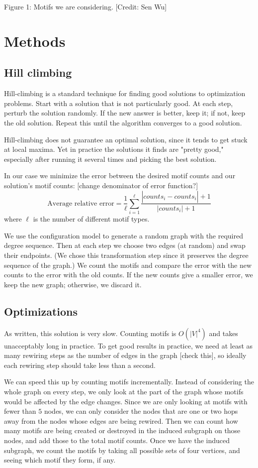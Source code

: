 \documentclass[12pt]{article}
\begin{document}
Figure 1: Motifs we are considering.  [Credit: Sen Wu]

\section{Methods}
\subsection{Hill climbing}
Hill-climbing is a standard technique for finding good solutions to optimization problems.  Start with a solution that is not particularly good.  At each step, perturb the solution randomly.  If the new answer is better, keep it; if not, keep the old solution.  Repeat this until the algorithm converges to a good solution.

Hill-climbing does not guarantee an optimal solution, since it tends to get stuck at local maxima.  Yet in practice the solutions it finds are "pretty good," especially after running it several times and picking the best solution.

In our case we minimize the error between the desired motif counts and our solution's motif counts: [change denominator of error function?] $$\mbox{Average relative error} = \frac{1}{\ell} \sum_{i = 1}^{\ell} \frac{|counts_i - \widehat{counts}_i| + 1}{|counts_i| + 1}$$ where $\ell$ is the number of different motif types.

We use the configuration model to generate a random graph with the required degree sequence.  Then at each step we choose two edges (at random) and swap their endpoints.  (We chose this transformation step since it preserves the degree sequence of the graph.)  We count the motifs and compare the error with the new counts to the error with the old counts.  If the new counts give a smaller error, we keep the new graph; otherwise, we discard it.

\subsection{Optimizations}
As written, this solution is very slow.  Counting motifs is $O(|V|^4)$ and takes unacceptably long in practice.  To get good results in practice, we need at least as many rewiring steps as the number of edges in the graph [check this], so ideally each rewiring step should take less than a second.

We can speed this up by counting motifs incrementally.  Instead of considering the whole graph on every step, we only look at the part of the graph whose motifs would be affected by the edge changes.  Since we are only looking at motifs with fewer than $5$ nodes, we can only consider the nodes that are one or two hops away from the nodes whose edges are being rewired.  Then we can count how many motifs are being created or destroyed in the induced subgraph on those nodes, and add those to the total motif counts.  Once we have the induced subgraph, we count the motifs by taking all possible sets of four vertices, and seeing which motif they form, if any.
\end{document}
